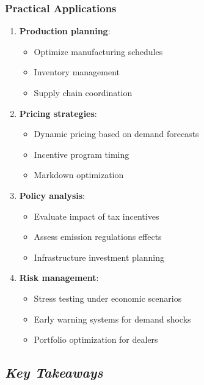 \documentclass[12pt]{article}
\begin{document}
\subsubsection*{Practical Applications}

\begin{enumerate}
    \item \textbf{Production planning}:
    \begin{itemize}
        \item Optimize manufacturing schedules
        \item Inventory management
        \item Supply chain coordination
    \end{itemize}

    \item \textbf{Pricing strategies}:
    \begin{itemize}
        \item Dynamic pricing based on demand forecasts
        \item Incentive program timing
        \item Markdown optimization
    \end{itemize}

    \item \textbf{Policy analysis}:
    \begin{itemize}
        \item Evaluate impact of tax incentives
        \item Assess emission regulations effects
        \item Infrastructure investment planning
    \end{itemize}

    \item \textbf{Risk management}:
    \begin{itemize}
        \item Stress testing under economic scenarios
        \item Early warning systems for demand shocks
        \item Portfolio optimization for dealers
    \end{itemize}
\end{enumerate}

\subsection*{\textit{Key Takeaways}}
\end{document}
